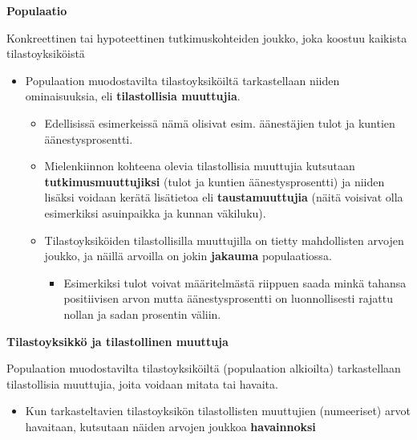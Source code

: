 \documentclass[
]{book}
\providecommand{\tightlist}{%
  \setlength{\itemsep}{0pt}\setlength{\parskip}{0pt}}
\begin{document}
\begin{defblock}{}
\textbf{Populaatio}

Konkreettinen tai hypoteettinen tutkimuskohteiden joukko, joka koostuu kaikista tilastoyksiköistä

\end{defblock}

\begin{itemize}
\tightlist
\item
  Populaation muodostavilta tilastoyksiköiltä tarkastellaan niiden ominaisuuksia, eli \textbf{tilastollisia muuttujia}.

  \begin{itemize}
  \tightlist
  \item
    Edellisissä esimerkeissä nämä olisivat esim. äänestäjien tulot ja kuntien äänestysprosentti.
  \item
    Mielenkiinnon kohteena olevia tilastollisia muuttujia kutsutaan \textbf{tutkimusmuuttujiksi} (tulot ja kuntien äänestysprosentti) ja niiden lisäksi voidaan kerätä lisätietoa eli \textbf{taustamuuttujia} (näitä voisivat olla esimerkiksi asuinpaikka ja kunnan väkiluku).
  \item
    Tilastoyksiköiden tilastollisilla muuttujilla on tietty mahdollisten arvojen joukko, ja näillä arvoilla on jokin \textbf{jakauma} populaatiossa.

    \begin{itemize}
    \tightlist
    \item
      Esimerkiksi tulot voivat määritelmästä riippuen saada minkä tahansa positiivisen arvon mutta äänestysprosentti on luonnollisesti rajattu nollan ja sadan prosentin väliin.
    \end{itemize}
  \end{itemize}
\end{itemize}

\begin{defblock}{}
\textbf{Tilastoyksikkö ja tilastollinen muuttuja}

Populaation muodostavilta tilastoyksiköiltä (populaation alkioilta) tarkastellaan tilastollisia muuttujia, joita voidaan mitata tai havaita.

\end{defblock}

\begin{itemize}
\tightlist
\item
  Kun tarkasteltavien tilastoyksikön tilastollisten muuttujien (numeeriset) arvot havaitaan, kutsutaan näiden arvojen joukkoa \textbf{havainnoksi}
\end{itemize}
\end{document}

